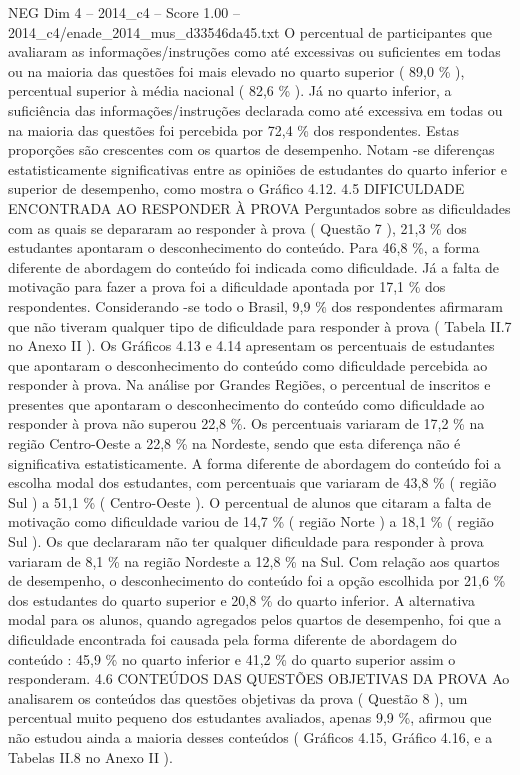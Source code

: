 \begin{textsample}{NEG Dim 4 – 2014\_c4 – Score 1.00 – 2014\_c4/enade\_2014\_mus\_d33546da45.txt}
O percentual de participantes que avaliaram as informações/instruções como até excessivas ou suficientes em todas ou na maioria das questões foi mais elevado no quarto superior ( 89,0 \% ), percentual superior à média nacional ( 82,6 \% ).
Já no quarto inferior, a suficiência das informações/instruções declarada como até excessiva em todas ou na maioria das questões foi percebida por 72,4 \% dos respondentes.
Estas proporções são crescentes com os quartos de desempenho.
Notam -se diferenças estatisticamente significativas entre as opiniões de estudantes do quarto inferior e superior de desempenho, como mostra o Gráfico 4.12. 4.5 DIFICULDADE ENCONTRADA AO RESPONDER À PROVA Perguntados sobre as dificuldades com as quais se depararam ao responder à prova ( Questão 7 ), 21,3 \% dos estudantes apontaram o desconhecimento do conteúdo.
Para 46,8 \%, a forma diferente de abordagem do conteúdo foi indicada como dificuldade.
Já a falta de motivação para fazer a prova foi a dificuldade apontada por 17,1 \% dos respondentes.
Considerando -se todo o Brasil, 9,9 \% dos respondentes afirmaram que não tiveram qualquer tipo de dificuldade para responder à prova ( Tabela II.7 no Anexo II ).
Os Gráficos 4.13 e 4.14 apresentam os percentuais de estudantes que apontaram o desconhecimento do conteúdo como dificuldade percebida ao responder à prova.
Na análise por Grandes Regiões, o percentual de inscritos e presentes que apontaram o desconhecimento do conteúdo como dificuldade ao responder à prova não superou 22,8 \%.
Os percentuais variaram de 17,2 \% na região Centro-Oeste a 22,8 \% na Nordeste, sendo que esta diferença não é significativa estatisticamente.
A forma diferente de abordagem do conteúdo foi a escolha modal dos estudantes, com percentuais que variaram de 43,8 \% ( região Sul ) a 51,1 \% ( Centro-Oeste ).
O percentual de alunos que citaram a falta de motivação como dificuldade variou de 14,7 \% ( região Norte ) a 18,1 \% ( região Sul ).
Os que declararam não ter qualquer dificuldade para responder à prova variaram de 8,1 \% na região Nordeste a 12,8 \% na Sul.
Com relação aos quartos de desempenho, o desconhecimento do conteúdo foi a opção escolhida por 21,6 \% dos estudantes do quarto superior e 20,8 \% do quarto inferior.
A alternativa modal para os alunos, quando agregados pelos quartos de desempenho, foi que a dificuldade encontrada foi causada pela forma diferente de abordagem do conteúdo : 45,9 \% no quarto inferior e 41,2 \% do quarto superior assim o responderam. 4.6 CONTEÚDOS DAS QUESTÕES OBJETIVAS DA PROVA Ao analisarem os conteúdos das questões objetivas da prova ( Questão 8 ), um percentual muito pequeno dos estudantes avaliados, apenas 9,9 \%, afirmou que não estudou ainda a maioria desses conteúdos ( Gráficos 4.15, Gráfico 4.16, e a Tabelas II.8 no Anexo II ).

\end{textsample}

